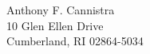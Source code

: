 \usepackage{lipsum}

Anthony F. Cannistra\\
10 Glen Ellen Drive\\
Cumberland, RI 02864-5034\\

\lipsum
